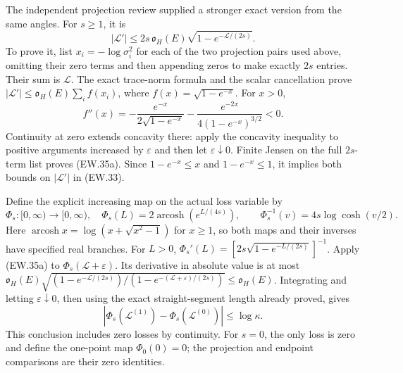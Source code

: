 \documentclass[11pt]{article}
\begin{document}
The independent projection review supplied a stronger exact version
from the same angles. For $s\ge1$, it is
\[
 \boxed{|\mathscr L'|\le
 2s\,\mathfrak o_H(E)\sqrt{1-e^{-\mathscr L/(2s)}}.}         \tag{EW.35a}
\]
To prove it, list $x_i=-\log\sigma_i^2$ for each of the two
projection pairs used above, omitting their zero terms and then
appending zeros to make exactly $2s$ entries. Their sum is
$\mathscr L$. The exact trace-norm formula and the scalar
cancellation prove
$|\mathscr L'|\le\mathfrak o_H(E)\sum_i f(x_i)$, where
$f(x)=\sqrt{1-e^{-x}}$. For $x>0$,
\[
 f''(x)=-\frac{e^{-x}}{2\sqrt{1-e^{-x}}}
        -\frac{e^{-2x}}{4(1-e^{-x})^{3/2}}<0.
\]
Continuity at zero extends concavity there: apply the concavity
inequality to positive arguments increased by $\varepsilon$ and
then let $\varepsilon\downarrow0$. Finite Jensen on the full
$2s$-term list proves (EW.35a). Since $1-e^{-x}\le x$ and
$1-e^{-x}\le1$, it implies both bounds on $|\mathscr L'|$
in (EW.33).

Define the explicit increasing map on the actual loss variable by
\[
 \Phi_s:[0,\infty)\longrightarrow[0,\infty),\quad
 \Phi_s(L)=2\operatorname{arcosh}(e^{L/(4s)}),\qquad
 \Phi_s^{-1}(v)=4s\log\cosh(v/2).
\]
Here $\operatorname{arcosh}x=\log(x+\sqrt{x^2-1})$ for
$x\ge1$, so both maps and their inverses have specified real
branches. For $L>0$,
$\Phi_s'(L)=[2s\sqrt{1-e^{-L/(2s)}}]^{-1}$.
Apply (EW.35a) to $\Phi_s(\mathscr L+\varepsilon)$.
Its derivative in absolute value is at most
$\mathfrak o_H(E)\sqrt{(1-e^{-\mathscr L/(2s)})/
(1-e^{-(\mathscr L+\varepsilon)/(2s)})}\le\mathfrak o_H(E)$.
Integrating and letting $\varepsilon\downarrow0$, then using
the exact straight-segment length already proved, gives
\[
 \boxed{|\Phi_s(\mathscr L^{(1)})-
               \Phi_s(\mathscr L^{(0)})|\le\log\kappa.}      \tag{EW.35b}
\]
This conclusion includes zero losses by continuity. For $s=0$,
the only loss is zero and define the one-point map $\Phi_0(0)=0$;
the projection and endpoint comparisons are their zero identities.
\end{document}
